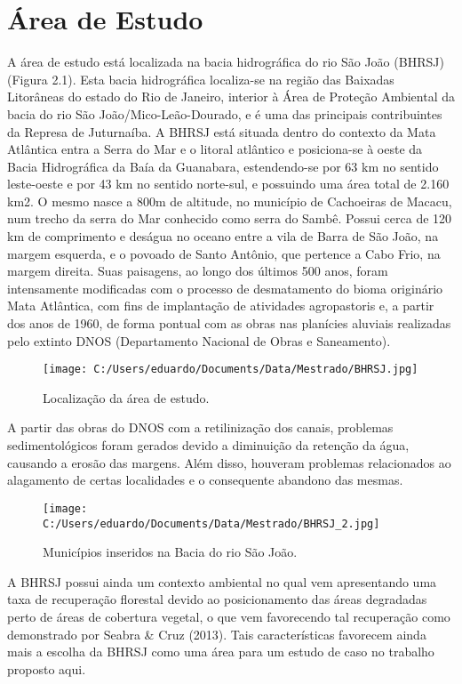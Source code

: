 \chapter{Área de Estudo}
A área de estudo está localizada na bacia hidrográfica do rio São João (BHRSJ) (Figura 2.1). Esta bacia hidrográfica localiza-se na região das Baixadas Litorâneas do estado do Rio de Janeiro, interior à Área de Proteção Ambiental da bacia do rio São João/Mico-Leão-Dourado, e é uma das principais contribuintes da Represa de Juturnaíba. A BHRSJ está situada dentro do contexto da Mata Atlântica entra a Serra do Mar e o litoral atlântico e posiciona-se à oeste da Bacia Hidrográfica da Baía da Guanabara, estendendo-se por 63 km no sentido leste-oeste e por 43 km no sentido norte-sul, e possuindo uma área total de 2.160 km2. O mesmo nasce a 800m de altitude, no município de Cachoeiras de Macacu, num trecho da serra do Mar conhecido como serra do Sambê. Possui cerca de 120 km de comprimento e deságua no oceano entre a vila de Barra de São João, na margem esquerda, e o povoado de Santo Antônio, que pertence a Cabo Frio, na margem direita. Suas paisagens, ao longo dos últimos 500 anos, foram intensamente modificadas com o processo de desmatamento do bioma originário Mata Atlântica, com fins de implantação de atividades agropastoris e, a partir dos anos de 1960, de forma pontual com as obras nas planícies aluviais realizadas pelo extinto DNOS (Departamento Nacional de Obras e Saneamento). \\

	\begin{figure}
	\centering
	\texttt{[image: C:/Users/eduardo/Documents/Data/Mestrado/BHRSJ.jpg]} 
	\caption{Localização da área de estudo.}
	\end{figure}

A partir das obras do DNOS com a retilinização dos canais, problemas sedimentológicos foram gerados devido a diminuição da retenção da água, causando a erosão das margens. Além disso, houveram problemas relacionados ao alagamento de certas localidades e o consequente abandono das mesmas. \\

	\begin{figure}
	\centering
	\texttt{[image: C:/Users/eduardo/Documents/Data/Mestrado/BHRSJ\_2.jpg]} 
	\caption{Municípios inseridos na Bacia do rio São João.}
	\end{figure}

A BHRSJ possui ainda um contexto ambiental no qual vem apresentando uma taxa de recuperação florestal devido ao posicionamento das áreas degradadas perto de áreas de cobertura vegetal, o que vem favorecendo tal recuperação como demonstrado por Seabra \& Cruz (2013). Tais características favorecem ainda mais a escolha da BHRSJ como uma área para um estudo de caso no trabalho proposto aqui. \\

